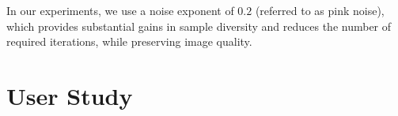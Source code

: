\documentclass[10pt,twocolumn,letterpaper]{article}
\begin{document}
In our experiments, we use a noise exponent of 
$0.2$ (referred to as pink noise), which provides substantial gains in sample diversity and reduces the number of required iterations, while preserving image quality.


\section{User Study}\label{sec:supp_user_study}

\begin{table}[t]
\caption{Human preference win rates from a user study for our method against $\text{i.i.d.}$ sampling and \citet{gi} for PixArt-$\alpha$~\cite{pixartalpha}, SANA-Sprint-1.6B~\cite{sanasprint}, and SDXL-Turbo~\cite{sdxlturbo}.}
\centering
{}
\label{tab:win_rates}
\end{table}
\end{document}
